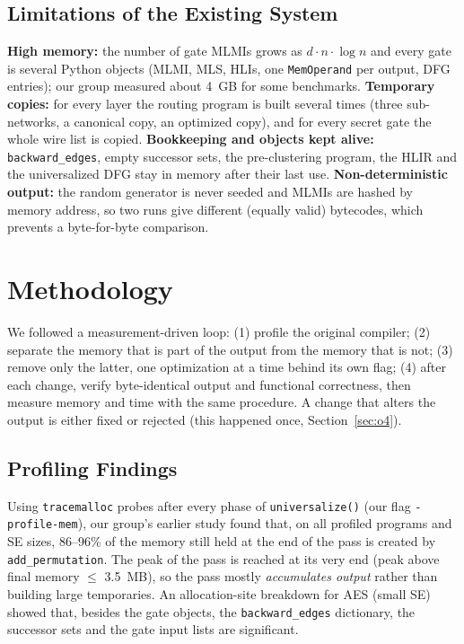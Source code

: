 \documentclass[12pt,a4paper,oneside]{report}
\newcommand{\code}[1]{\texttt{#1}}
\begin{document}
\subsection{Limitations of the Existing System}
\label{sec:limits}
\textbf{High memory:} the number of gate MLMIs grows as $d \cdot n \cdot \log n$ and every gate is
several Python objects (MLMI, MLS, HLIs, one \code{MemOperand} per output, DFG entries); our group
measured about 4~GB for some benchmarks. \textbf{Temporary copies:} for every layer the routing
program is built several times (three sub-networks, a canonical copy, an optimized copy), and for
every secret gate the whole wire list is copied. \textbf{Bookkeeping and objects kept alive:}
\code{backward\_edges}, empty successor sets, the pre-clustering program, the HLIR and the
universalized DFG stay in memory after their last use. \textbf{Non-deterministic output:} the
random generator is never seeded and MLMIs are hashed by memory address, so two runs give
different (equally valid) bytecodes, which prevents a byte-for-byte comparison.

\section{Methodology}
We followed a measurement-driven loop: (1) profile the original compiler; (2) separate the memory
that is part of the output from the memory that is not; (3) remove only the latter, one
optimization at a time behind its own flag; (4) after each change, verify byte-identical output and
functional correctness, then measure memory and time with the same procedure. A change that alters
the output is either fixed or rejected (this happened once, Section~\ref{sec:o4}).

\subsection{Profiling Findings}
Using \code{tracemalloc} probes after every phase of \code{universalize()} (our flag
\code{-profile-mem}), our group's earlier study found that, on all profiled programs and SE sizes,
86--96\% of the memory still held at the end of the pass is created by \code{add\_permutation}. The peak of the pass is reached at its very end (peak above final
memory $\le$ 3.5~MB), so the pass mostly \emph{accumulates output} rather than building large
temporaries. An allocation-site breakdown for AES (small SE) showed that, besides the gate objects,
the \code{backward\_edges} dictionary, the successor sets and the gate input lists are significant.
\end{document}

